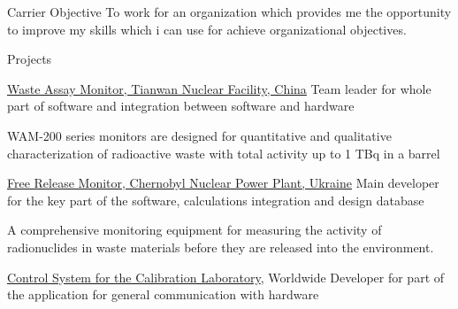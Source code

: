 \documentclass{cv} %
\begin{document}
\begin{rSection}{Carrier Objective}
 To work for an organization which provides me the opportunity to improve my skills which i can use for achieve organizational objectives.
\end{rSection}
\begin{rSection}{Projects}
\begin{rSubsection}
{\href{https://www.vfnuclear.com/en/products/waste-assay-monitor}{Waste Assay Monitor, Tianwan Nuclear Facility, China}}{}
{Team leader for whole part of software and integration between software and hardware}{}

WAM-200 series monitors are designed for quantitative and qualitative characterization of radioactive waste with total activity up to 1 TBq in a barrel
\end{rSubsection}

\begin{rSubsection}
{\href{https://www.vfnuclear.com/en/free-release-monitor-frm-03-delivery-for-chernobyl-npp}{Free Release Monitor, Chernobyl Nuclear Power Plant, Ukraine}}{}
{Main developer for the key part of the software, calculations integration and design database}{}

A comprehensive monitoring equipment for measuring the activity of radionuclides in waste materials before they are released into the environment.
\end{rSubsection}



\begin{rSubsection}
{\href{https://www.vf.cz/en/products/dars-control-system-for-the-calibration-laboratory-dars}{Control System for the Calibration Laboratory}, Worldwide}{}
{Developer for part of the application for general communication with hardware}{}


\end{rSubsection}
\end{rSection}
\end{document}
